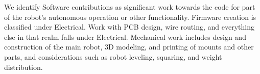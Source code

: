 We identify Software contributions as significant work towards the code for part of the robot’s autonomous operation or other functionality.  Firmware creation is classified under Electrical. Work with PCB design, wire routing, and everything else in that realm falls under Electrical. Mechanical work includes design and construction of the main robot, 3D modeling, and printing of mounts and other parts, and considerations such as robot leveling, squaring, and weight distribution.

